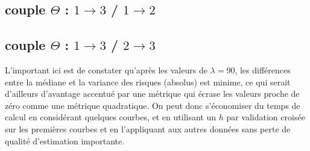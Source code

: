 \pagebreak
\subsection{couple \texorpdfstring{$\Theta$ : $1 \rightarrow 3$ / $1 \rightarrow 2$}{𝜣 : 1→3/1→2}}


\subsection{couple \texorpdfstring{$\Theta$ : $1 \rightarrow 3$ / $2 \rightarrow 3$}{𝜣 : 1→3/2→3}}

\bigskip


\begin{leftbar}
	L'important ici est de constater qu'après les valeurs de $\lambda = 90$, les différences entre la médiane et la variance des risques (absolus) est minime, ce qui serait d'ailleurs d'avantage accentué par une métrique qui écrase les valeurs proche de zéro comme une métrique quadratique. On peut donc s'économiser du temps de calcul en considérant quelques courbes, et en utilisant un $h$ par validation croisée sur les premières courbes et en l'appliquant aux autres données sans perte de qualité d'estimation importante.
\end{leftbar}







